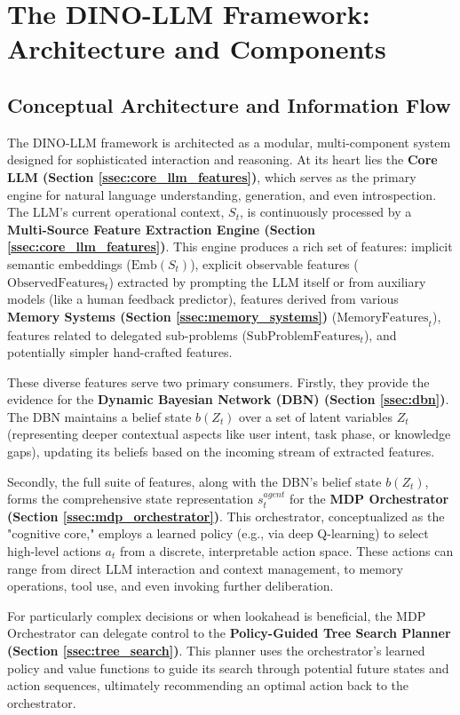 \documentclass[11pt]{article}
\begin{document}
\section{The DINO-LLM Framework: Architecture and Components}
\label{sec:framework}

\subsection{Conceptual Architecture and Information Flow}
\label{ssec:architecture_flow}
The DINO-LLM framework is architected as a modular, multi-component system designed for sophisticated interaction and reasoning. At its heart lies the \textbf{Core LLM (Section \ref{ssec:core_llm_features})}, which serves as the primary engine for natural language understanding, generation, and even introspection. The LLM's current operational context, $S_t$, is continuously processed by a \textbf{Multi-Source Feature Extraction Engine (Section \ref{ssec:core_llm_features})}. This engine produces a rich set of features: implicit semantic embeddings ($\text{Emb}(S_t)$), explicit observable features ($\text{ObservedFeatures}_t$) extracted by prompting the LLM itself or from auxiliary models (like a human feedback predictor), features derived from various \textbf{Memory Systems (Section \ref{ssec:memory_systems})} ($\text{MemoryFeatures}_t$), features related to delegated sub-problems ($\text{SubProblemFeatures}_t$), and potentially simpler hand-crafted features.

These diverse features serve two primary consumers. Firstly, they provide the evidence for the \textbf{Dynamic Bayesian Network (DBN) (Section \ref{ssec:dbn})}. The DBN maintains a belief state $b(Z_t)$ over a set of latent variables $Z_t$ (representing deeper contextual aspects like user intent, task phase, or knowledge gaps), updating its beliefs based on the incoming stream of extracted features.

Secondly, the full suite of features, along with the DBN's belief state $b(Z_t)$, forms the comprehensive state representation $s_t^{agent}$ for the \textbf{MDP Orchestrator (Section \ref{ssec:mdp_orchestrator})}. This orchestrator, conceptualized as the "cognitive core," employs a learned policy (e.g., via deep Q-learning) to select high-level actions $a_t$ from a discrete, interpretable action space. These actions can range from direct LLM interaction and context management, to memory operations, tool use, and even invoking further deliberation.

For particularly complex decisions or when lookahead is beneficial, the MDP Orchestrator can delegate control to the \textbf{Policy-Guided Tree Search Planner (Section \ref{ssec:tree_search})}. This planner uses the orchestrator's learned policy and value functions to guide its search through potential future states and action sequences, ultimately recommending an optimal action back to the orchestrator.
\end{document}
